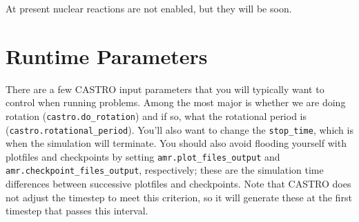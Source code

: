 \documentclass[12pt]{book}
\begin{document}
At present nuclear reactions are not enabled, but they will be soon.

\section{Runtime Parameters}

There are a few CASTRO input parameters that you will typically want to control when running problems. 
Among the most major is whether we are doing rotation (\texttt{castro.do\_rotation}) and if so, 
what the rotational period is (\texttt{castro.rotational\_period}). You'll also want to change the 
\texttt{stop\_time}, which is when the simulation will terminate. You should also avoid flooding 
yourself with plotfiles and checkpoints by setting \texttt{amr.plot\_files\_output} and 
\texttt{amr.checkpoint\_files\_output}, respectively; these are the simulation time differences
between successive plotfiles and checkpoints. Note that CASTRO does not adjust the timestep 
to meet this criterion, so it will generate these at the first timestep that passes this interval.
\end{document}
